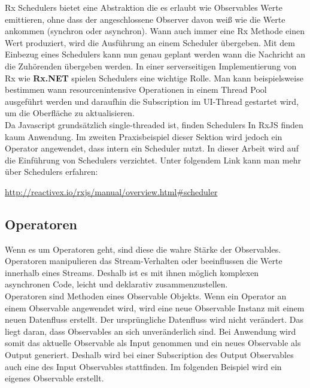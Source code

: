 Rx Schedulers bietet eine Abstraktion die es erlaubt wie Observables Werte emittieren, ohne dass der angeschlossene Observer davon weiß wie die Werte ankommen (synchron oder asynchron). Wann auch immer eine Rx Methode einen Wert produziert, wird die Ausführung an einem Scheduler übergeben. Mit dem Einbezug eines Schedulers kann nun genau geplant werden wann die Nachricht an die Zuhörenden übergeben werden. In einer serverseitigen Implementierung von Rx wie \textbf{Rx.NET} spielen Schedulers eine wichtige Rolle. Man kann beispielsweise bestimmen wann resourcenintensive Operationen in einem Thread Pool ausgeführt werden und daraufhin die Subscription im UI-Thread gestartet wird, um die Oberfläche zu aktualisieren\cite{rx-schedulers}.\\

\noindent
Da Javascript grundsätzlich single-threaded ist, finden Schedulers In RxJS finden kaum Anwendung. Im zweiten Praxisbeispiel dieser Sektion wird jedoch ein Operator angewendet, dass intern ein Scheduler nutzt. In dieser Arbeit wird auf die Einführung von Schedulers verzichtet. Unter folgendem Link kann man mehr über Schedulers erfahren:

\begin{center}
    \url{http://reactivex.io/rxjs/manual/overview.html#scheduler}
\end{center}

\subsection{Operatoren}

Wenn es um Operatoren geht, sind diese die wahre Stärke der Observables. Operatoren manipulieren das Stream-Verhalten oder beeinflussen die Werte innerhalb eines Streams. Deshalb ist es mit ihnen möglich komplexen asynchronen Code, leicht und deklarativ zusammenzustellen.\\

\noindent
Operatoren sind Methoden eines Observable Objekts. Wenn ein Operator an einem Observable angewendet wird, wird eine neue Observable Instanz mit einem neuen Datenfluss erstellt. Der ursprüngliche Datenfluss wird nicht verändert. Das liegt daran, dass Observables an sich unveränderlich sind. Bei Anwendung wird somit das aktuelle Observable als Input genommen und ein neues Observable als Output generiert. Deshalb wird bei einer Subscription des Output Observables auch eine des Input Observables stattfinden. Im folgenden Beispiel wird ein eigenes Observable erstellt.

